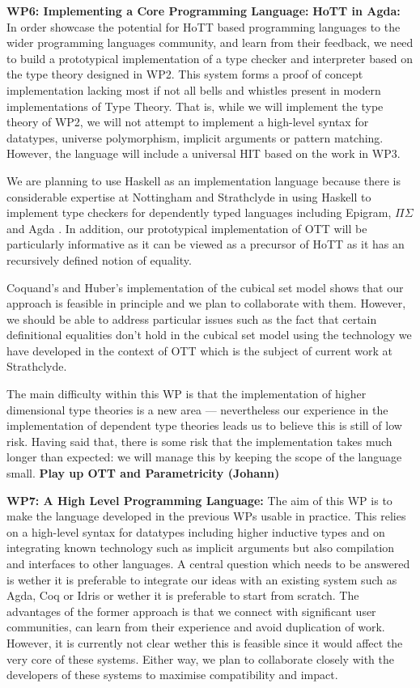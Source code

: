 \documentclass[a4paper,11pt]{article}
\begin{document}
{\bf WP6: Implementing a Core Programming Language:} {\bf HoTT in
  Agda:} In order showcase the potential for HoTT based programming
languages to the wider programming languages community, and learn from
their feedback, we need to build a prototypical implementation of a
type checker and interpreter based on the type theory designed in WP2.
This system forms a proof of concept implementation lacking most if
not all bells and whistles present in modern implementations of Type
Theory. That is, while we will implement the type theory of WP2, we
will not attempt to implement a high-level syntax for datatypes,
universe polymorphism, implicit arguments or pattern
matching. However, the language will include a universal HIT based on
the work in WP3.

We are planning to use Haskell as an implementation language because
there is considerable expertise at Nottingham and Strathclyde in using
Haskell to implement type checkers for dependently typed languages
including Epigram, $\Pi\Sigma$ and Agda \cite{epigram,easy,pisigma}.
In addition, our prototypical implementation of OTT will be
particularly informative as it can be viewed as a precursor of HoTT as
it has an recursively defined notion of equality. 

Coquand's and Huber's implementation of the cubical set model shows
that our approach is feasible in principle and we plan to collaborate
with them. However, we should be able to address particular issues
such as the fact that certain definitional equalities don't hold in
the cubical set model using the technology we have developed in the
context of OTT \cite{alti:ott-conf} which is the subject of current
work at Strathclyde.

The main difficulty within this WP is that the implementation of
higher dimensional type theories is a new area --- nevertheless our
experience in the implementation of dependent type theories leads us
to believe this is still of low risk. Having said that, there is some
risk that the implementation takes much longer than expected: we will
manage this by keeping the scope of the language small. {\bf Play up OTT and Parametricity (Johann)}

{\bf WP7: A High Level Programming Language:}
The aim of this WP is to make the language developed in the previous
WPs usable in practice. This relies on a high-level syntax for
datatypes including higher inductive types and on integrating known
technology such as implicit arguments but also compilation and
interfaces to other languages. A central question which needs to be
answered is wether it is preferable to integrate our ideas with an
existing system such as Agda, Coq or Idris or wether it is preferable
to start from scratch. The advantages of the former approach is that
we connect with significant user communities, can learn from their
experience and avoid duplication of work. However, it is currently
not clear wether this is feasible since it would affect the very
core of these systems. Either way, we plan to collaborate closely with
the developers of these systems to maximise compatibility and impact.
\end{document}
